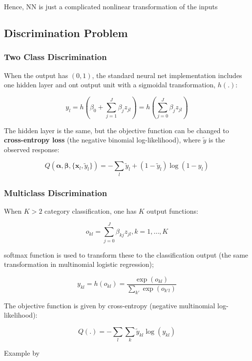 \documentclass[
]{book}
\begin{document}
Hence, NN is just a complicated nonlinear transformation of the inputs

\hypertarget{discrimination-problem}{%
\subsection{Discrimination Problem}\label{discrimination-problem}}

\hypertarget{two-class-discrimination}{%
\subsubsection{Two Class Discrimination}\label{two-class-discrimination}}

When the output has \((0,1)\), the standard neural net implementation includes one hidden layer and ont output unit with a sigmoidal transformation, \(h(.)\):

\[
y_l = h(\beta_0 + \sum_{j = 1}^J \beta_j z_{jl}) = h(\sum_{j=0}^J \beta_j z_{jl})
\]

The hidden layer is the same, but the objective function can be changed to \textbf{cross-entropy loss} (the negative binomial log-likelihood), where \(\tilde{y}\) is the observed response:

\[
Q(\mathbf{\alpha}, \mathbf{\beta}, \{ \mathbf{x}_l , \tilde{y}_l \}) = - \sum_l \tilde{y}_l + ( 1 - \tilde{y}_l) \log(1 - y_l)
\]

\hypertarget{multiclass-discrimination}{%
\subsubsection{Multiclass Discrimination}\label{multiclass-discrimination}}

When \(K > 2\) category classification, one has \(K\) output functions:

\[
o_{kl} = \sum_{j = 0}^{J} \beta_{kj} z_{jl}, k = 1, \dots, K
\]

softmax function is used to transform these to the classification output (the same transformation in multinomial logistic regression);

\[
y_{kl} = h(o_{kl}) = \frac{ \exp(o_{kl})}{\sum_{k'} \exp( o_{k'l})}
\]

The objective function is given by cross-entropy (negative multinomial log-likelihood):

\[
Q(.) = - \sum_l \sum_k \tilde{y}_{kl} \log(y_{kl})
\]

Example by \citep[ Ch. 10]{james2013}
\end{document}
